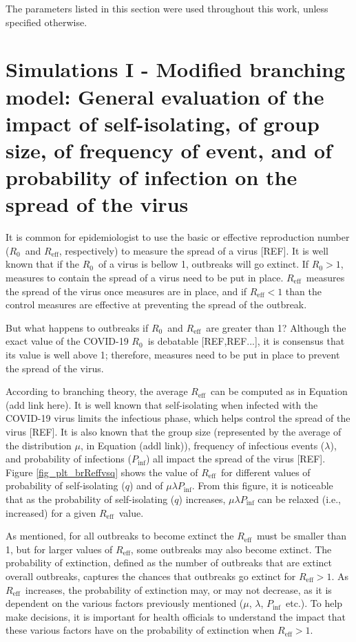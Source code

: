 \documentclass[sr]{drdc-report}
\def\Rz{\ensuremath{R_0}}
\def\Reff{\ensuremath{R_\mathrm{eff}}}
\def\Pinf{\ensuremath{P_\mathrm{inf}}}
\begin{document}
The parameters listed in this section were used throughout this work, unless specified otherwise. 


\section{Simulations I - Modified branching model: General evaluation of the impact of self-isolating, of group size, of frequency of event, and of probability of infection on the spread of the virus}\label{Scenario_I_section_label}

It is common for epidemiologist to use the basic or effective reproduction number (\Rz\ and \Reff, respectively) to measure the spread of a virus [REF]. It is well known that if the \Rz\ of a virus is bellow 1, outbreaks will go extinct. If $\Rz > 1$, measures to contain the spread of a virus need to be put in place. \Reff\ measures the spread of the virus once measures are in place, and if $\Reff < 1$ than the control measures are effective at preventing the spread of the outbreak. 

But what happens to outbreaks if \Rz\ and \Reff\ are greater than 1? Although the exact value of the COVID-19 \Rz\ is debatable [REF,REF...], it is consensus that its value is well above 1; therefore, measures need to be put in place to prevent the spread of the virus. 

According to branching theory, the average \Reff\ can be computed as in Equation (add link here). It is well known that self-isolating when infected with the COVID-19 virus limits the infectious phase, which helps control the spread of the virus [REF]. It is also known that the group size (represented by the average of the distribution $\mu$, in Equation (addl link)), frequency of infectious events ($\lambda$), and probability of infections (\Pinf) all impact the spread of the virus [REF]. Figure \ref{fig_plt_brReffvsq} shows the value of \Reff\ for different values of probability of self-isolating ($q$) and of $\mu\lambda\Pinf$. From this figure, it is noticeable that as the probability of self-isolating ($q$) increases, $\mu\lambda\Pinf$ can be relaxed (i.e., increased) for a given \Reff\ value. 

As mentioned, for all outbreaks to become extinct the \Reff\ must be smaller than 1, but for larger values of \Reff, some outbreaks may also become extinct. The probability of extinction, defined as the number of outbreaks that are extinct overall outbreaks, captures the chances that outbreaks go extinct for $\Reff > 1$. As \Reff\ increases, the probability of extinction may, or may not decrease, as it is dependent on the various factors previously mentioned ($\mu$, $\lambda$, \Pinf\, etc.). To help make decisions, it is important for health officials to understand the impact that these various factors have on the probability of extinction when $\Reff > 1$. 
\end{document}
